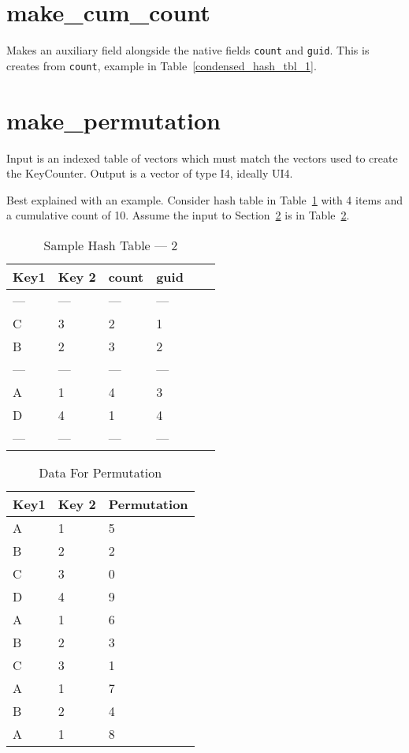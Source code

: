 \section{make\_cum\_count}
\label{make_cum_count}

Makes an auxiliary field alongside the native fields {\tt count}
and {\tt guid}. This is creates from {\tt count}, example in 
Table~\ref{condensed_hash_tbl_1}.

\section{make\_permutation}
\label{make_permutation}
Input is an indexed table of vectors which must match the vectors used to create
the KeyCounter. Output is a vector of type I4, ideally UI4.

Best explained with an example. 
Consider hash table in Table~\ref{hash_tbl_2} with 4 items and a 
cumulative count of 10. Assume the input to Section~\ref{make_permutation} is in
Table~\ref{data_1}. 

\begin{table}
\centering
\begin{tabular}{|l|l||l|l|l||l|} \hline \hline 
{\bf Key1 } & {\bf Key 2} & {\bf count} & {\bf guid} \\ \hline \hline
--- & --- & --- & ---  \\ \hline
  C &  3  &  2  &  1   \\ \hline
  B &  2  &  3  &  2   \\ \hline
--- & --- & --- & ---  \\ \hline
  A &  1  &  4  &  3   \\ \hline
  D &  4  &  1  &  4   \\ \hline
--- & --- & --- & ---  \\ \hline
\hline
\end{tabular}
\caption{Sample Hash Table --- 2}
\label{hash_tbl_2}
\end{table}

\begin{table}
\centering
\begin{tabular}{|l|l||l|} \hline \hline 
{\bf Key1 } & {\bf Key 2} & {\bf Permutation} \\ \hline \hline
A & 1 & 5 \\ \hline
B & 2 & 2 \\ \hline
C & 3 & 0 \\ \hline
D & 4 & 9 \\ \hline
A & 1 & 6 \\ \hline
B & 2 & 3 \\ \hline
C & 3 & 1 \\ \hline
A & 1 & 7 \\ \hline
B & 2 & 4 \\ \hline
A & 1 & 8 \\ \hline
\hline
\end{tabular}
\caption{Data For Permutation}
\label{data_1}
\end{table}
